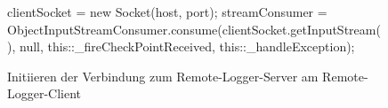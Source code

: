 \begin{figure}[h] 
    \centering
	\begin{spacing}{0.75}
		\begin{javacode}[firstnumber=32]
clientSocket = new Socket(host, port);
streamConsumer = ObjectInputStreamConsumer.consume(clientSocket.getInputStream(), null, 
                                   this::_fireCheckPointReceived, this::_handleException);\end{javacode}
	\end{spacing}
	\caption{Initiieren der Verbindung zum Remote-Logger-Server am Remote-Logger-Client}
\end{figure}